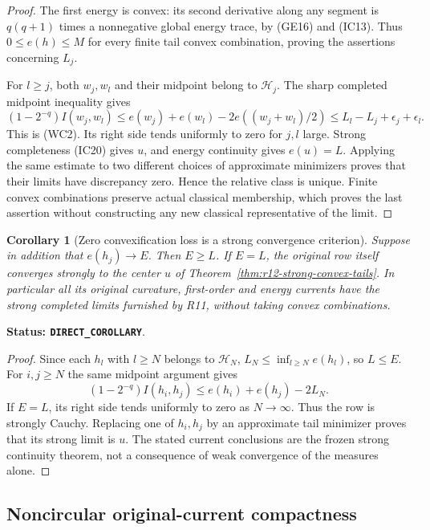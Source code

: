 \documentclass[11pt,a4paper]{article}
\numberwithin{equation}{section}
\newtheorem{corollary}[theorem]{Corollary}
\theoremstyle{definition}
\theoremstyle{remark}
\begin{document}
\begin{proof}
The first energy is convex: its second derivative along any segment
is $q(q+1)$ times a nonnegative global energy trace, by (GE16) and
(IC13).  Thus $0\leq e(h)\leq M$ for every finite tail convex
combination, proving the assertions concerning $L_j$.

For $l\geq j$, both $w_j,w_l$ and their midpoint belong to
$\mathcal H_j$.  The sharp completed midpoint inequality gives
\[
 (1-2^{-q})I(w_j,w_l)
   \leq e(w_j)+e(w_l)-2e((w_j+w_l)/2)
   \leq L_l-L_j+\epsilon_j+\epsilon_l.
\]
This is (WC2).  Its right side tends uniformly to zero for
$j,l$ large.  Strong completeness (IC20) gives $u$, and energy
continuity gives $e(u)=L$.  Applying the same estimate to two
different choices of approximate minimizers proves that their
limits have discrepancy zero.  Hence the relative class is unique.
Finite convex combinations preserve actual classical membership,
which proves the last assertion without constructing any new
classical representative of the limit.
\end{proof}

\begin{corollary}[Zero convexification loss is a strong convergence criterion]
\label{cor:r12-no-convexification-loss}
Suppose in addition that $e(h_j)\to E$.  Then $E\geq L$.  If $E=L$,
the original row itself converges strongly to the center $u$ of
Theorem~\ref{thm:r12-strong-convex-tails}.  In particular all its
original curvature, first-order and energy currents have the strong
completed limits furnished by R11, without taking convex combinations.
\end{corollary}

\noindent\textbf{Status: \texttt{DIRECT\_COROLLARY}}.

\begin{proof}
Since each $h_l$ with $l\geq N$ belongs to $\mathcal H_N$,
$L_N\leq\inf_{l\geq N}e(h_l)$, so $L\leq E$.  For $i,j\geq N$
the same midpoint argument gives
\[
 (1-2^{-q})I(h_i,h_j)\leq e(h_i)+e(h_j)-2L_N.
\]
If $E=L$, its right side tends uniformly to zero as $N\to\infty$.
Thus the row is strongly Cauchy.  Replacing one of $h_i,h_j$ by
an approximate tail minimizer proves that its strong limit is $u$.
The stated current conclusions are the frozen strong continuity
theorem, not a consequence of weak convergence of the measures alone.
\end{proof}

\subsection{Noncircular original-current compactness}
\end{document}

